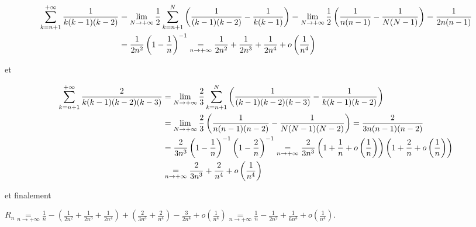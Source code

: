 {{\begin{align*}\ensuremath
\sum_{k=n+1}^{+\infty}\frac{1}{k(k-1)(k-2)}&=\lim_{N \rightarrow +\infty}\frac{1}{2}\sum_{k=n+1}^{N}\left(\frac{1}{(k-1)(k-2)}-\frac{1}{k(k-1)}\right)=\lim_{N \rightarrow +\infty}\frac{1}{2}\left(\frac{1}{n(n-1)}-\frac{1}{N(N-1)}\right)=\frac{1}{2n(n-1)}\\
 &=\frac{1}{2n^2}\left(1-\frac{1}{n}\right)^{-1}\underset{n\rightarrow+\infty}{=}\frac{1}{2n^2}+\frac{1}{2n^3}+\frac{1}{2n^4}+o\left(\frac{1}{n^4}\right)
\end{align*}

et

\begin{align*}\ensuremath
\sum_{k=n+1}^{+\infty}\frac{2}{k(k-1)(k-2)(k-3)}&=\lim_{N \rightarrow +\infty}\frac{2}{3}\sum_{k=n+1}^{N}\left(\frac{1}{(k-1)(k-2)(k-3)}-\frac{1}{k(k-1)(k-2)}\right)\\
 &=\lim_{N \rightarrow +\infty}\frac{2}{3}\left(\frac{1}{n(n-1)(n-2)}-\frac{1}{N(N-1)(N-2)}\right)=\frac{2}{3n(n-1)(n-2)}\\
 &=\frac{2}{3n^3}\left(1-\frac{1}{n}\right)^{-1}\left(1-\frac{2}{n}\right)^{-1}\underset{n\rightarrow+\infty}{=}\frac{2}{3n^3}\left(1+\frac{1}{n}+o\left(\frac{1}{n}\right)\right)\left(1+\frac{2}{n}+o\left(\frac{1}{n}\right)\right)\\
  &\underset{n\rightarrow+\infty}{=}\frac{2}{3n^3}+\frac{2}{n^4}+o\left(\frac{1}{n^4}\right)
\end{align*}

et finalement

\begin{center}
$R_n\underset{n\rightarrow+\infty}{=}\frac{1}{n}-\left(\frac{1}{2n^2}+\frac{1}{2n^3}+\frac{1}{2n^4}\right)+\left(\frac{2}{3n^3}+\frac{2}{n^4}\right)-\frac{3}{2n^4}+o\left(\frac{1}{n^4}\right)\underset{n\rightarrow+\infty}{=}\frac{1}{n}-\frac{1}{2n^2}+\frac{1}{6n^3}+o\left(\frac{1}{n^4}\right)$.
\end{center}

\begin{center}
\end{center}}
}